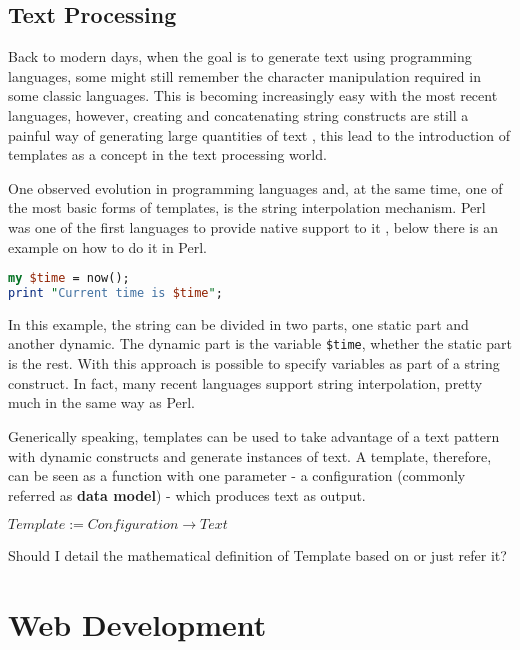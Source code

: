 \subsection{Text Processing}

Back to modern days, when the goal is to generate text using programming languages, some might still remember the character manipulation required in some classic languages. This is becoming increasingly easy with the most recent languages, however, creating and concatenating string constructs are still a painful way of generating large quantities of text \cite{Fowler2003PatternsArchitecture}, this lead to the introduction of templates as a concept in the text processing world.

One observed evolution in programming languages and, at the same time, one of the most basic forms of templates, is the string interpolation mechanism. Perl was one of the first languages to provide native support to it \cite{Wall2000ProgrammingPerl}, below there is an example on how to do it in Perl.

\begin{lstlisting}[language=Perl]
my $time = now();
print "Current time is $time";
\end{lstlisting}

In this example, the string can be divided in two parts, one static part and another dynamic. The dynamic part is the variable \texttt{\$time}, whether the static part is the rest. With this approach is possible to specify variables as part of a string construct. In fact, many recent languages support string interpolation, pretty much in the same way as Perl. 

Generically speaking, templates can be used to take advantage of a text pattern with dynamic constructs and generate instances of text. A template, therefore, can be seen as a function with one parameter - a configuration (commonly referred as \textbf{data model}) - which produces text as output. 

\begin{center}
$Template := Configuration \rightarrow Text$
\end{center}

\begin{orientador}
    Should I detail the mathematical definition of Template based on \cite{Parr2004EnforcingEngines} or just refer it?
\end{orientador}

\section{Web Development}

